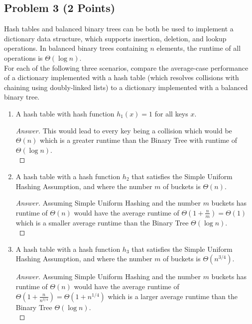 \documentclass[11pt]{article}
\theoremstyle{definition}
\theoremstyle{definition}
\theoremstyle{definition}
\begin{document}
\newpage
\subsection{Problem 3 (2 Points)}
Hash tables and balanced binary trees can be both be used to implement a dictionary data structure, which supports insertion, deletion, and lookup operations. In balanced binary trees containing $n$ elements, the runtime of all operations is $\Theta(\log n)$.  \\

    \noindent For each of the following three scenarios, compare the average-case performance of a dictionary implemented with a hash table (which resolves collisions with chaining using doubly-linked lists) to a dictionary implemented with a balanced binary tree.
        
    \begin{enumerate}[label=(\alph*)]
    \item A hash table with hash function $h_1(x)=1$ for all keys $x$.
    
    \begin{proof}[Answer]
        This would lead to every key being a collision which would be $\Theta(n)$ which is a greater runtime than the Binary Tree with runtime of $\Theta(\log n)$.\\
        
    \end{proof}
    
    
    \vskip 15pt
    \item A hash table with a hash function $h_2$ that satisfies the Simple Uniform Hashing Assumption, and where the number $m$ of buckets is $\Theta(n)$.
    \begin{proof}[Answer]
        Assuming Simple Uniform Hashing and the number $m$ buckets has runtime of $\Theta(n)$ would have the average runtime of $\Theta(1 + \frac{n}{m}) = \Theta(1)$ which is a smaller average runtime than the Binary Tree $\Theta(\log n)$.\\
        
    \end{proof}
    
    
    \vskip 15pt	
    \item A hash table with a hash function $h_3$ that satisfies the Simple Uniform Hashing Assumption, and where the number $m$ of buckets is $\Theta(n^{3/4})$.
    \begin{proof}[Answer]
        Assuming Simple Uniform Hashing and the number $m$ buckets has runtime of $\Theta(n)$ would have the average runtime of $\Theta(1 + \frac{n}{n^{3/4}}) = \Theta(1 + n^{1/4})$ which is a larger average runtime than the Binary Tree $\Theta(\log n)$.\\
    \end{proof}
    
    \end{enumerate}


\end{document}
